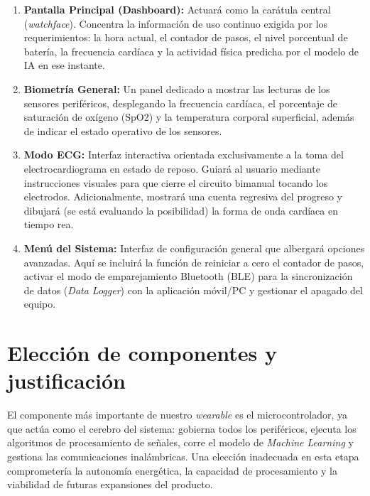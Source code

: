 \documentclass[letterpaper,11pt]{article}
\begin{document}
\begin{enumerate}
    \item \textbf{Pantalla Principal (Dashboard):} Actuará como la carátula central (\textit{watchface}). Concentra la información de uso continuo exigida por los requerimientos: la hora actual, el contador de pasos, el nivel porcentual de batería, la frecuencia cardíaca y la actividad física predicha por el modelo de IA en ese instante.
    \item \textbf{Biometría General:} Un panel dedicado a mostrar las lecturas de los sensores periféricos, desplegando la frecuencia cardíaca, el porcentaje de saturación de oxígeno (SpO2) y la temperatura corporal superficial, además de indicar el estado operativo de los sensores.
    \item \textbf{Modo ECG:} Interfaz interactiva orientada exclusivamente a la toma del electrocardiograma en estado de reposo. Guiará al usuario mediante instrucciones visuales para que cierre el circuito bimanual tocando los electrodos. Adicionalmente, mostrará una cuenta regresiva del progreso y dibujará (se está evaluando la posibilidad) la forma de onda cardíaca en tiempo rea.
    \item \textbf{Menú del Sistema:} Interfaz de configuración general que albergará opciones avanzadas. Aquí se incluirá la función de reiniciar a cero el contador de pasos, activar el modo de emparejamiento Bluetooth (BLE) para la sincronización de datos (\textit{Data Logger}) con la aplicación móvil/PC y gestionar el apagado del equipo.
\end{enumerate}
\section{Elección de componentes y justificación}

El componente más importante de nuestro \textit{wearable} es el microcontrolador, ya que actúa como el cerebro del sistema: gobierna todos los periféricos, ejecuta los algoritmos de procesamiento de señales, corre el modelo de \textit{Machine Learning} y gestiona las comunicaciones inalámbricas. Una elección inadecuada en esta etapa comprometería la autonomía energética, la capacidad de procesamiento y la viabilidad de futuras expansiones del producto.
\end{document}
